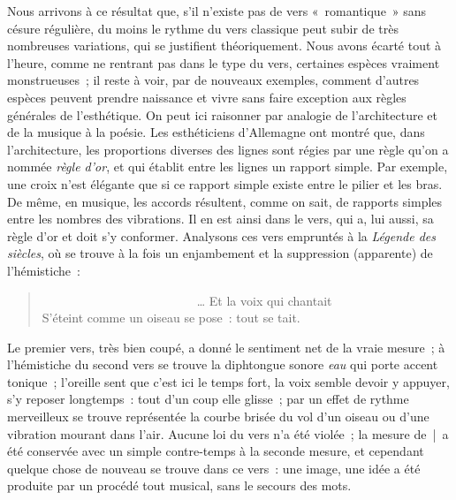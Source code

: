 \documentclass[french,twoside]{book} %
\begin{document}
Nous arrivons à ce résultat que, s’il n’existe pas de vers « romantique » sans césure régulière, du moins le rythme du vers classique peut subir de très nombreuses variations, qui se justifient théoriquement. Nous avons écarté tout à l’heure, comme ne rentrant pas dans le type du vers, certaines espèces vraiment monstrueuses ; il reste à voir, par de nouveaux exemples, comment d’autres espèces peuvent prendre naissance et vivre sans faire exception aux règles générales de l’esthétique. On peut ici raisonner par analogie de l’architecture et de la musique à la poésie. Les esthéticiens d’Allemagne ont montré que, dans l’architecture, les proportions diverses des lignes sont régies par une règle qu’on a nommée \emph{règle d’or}, et qui établit entre les lignes un rapport simple. Par exemple, une croix n’est  élégante que si ce rapport simple existe entre le pilier et les bras. De même, en musique, les accords résultent, comme on sait, de rapports simples entre les nombres des vibrations. Il en est ainsi dans le vers, qui a, lui aussi, sa règle d’or et doit s’y conformer. Analysons ces vers empruntés à la \emph{Légende des siècles}, où se trouve à la fois un enjambement et la suppression (apparente) de l’hémistiche :\par


\begin{verse}
                         … Et la voix qui chantait\\
S’éteint comme un oiseau se pose : tout se tait.\\
\end{verse}

\noindent Le premier vers, très bien coupé, a donné le sentiment net de la vraie mesure ; à l’hémistiche du second vers se trouve la diphtongue sonore \emph{eau} qui porte accent tonique ; l’oreille sent que c’est ici le temps fort, la voix semble devoir y appuyer, s’y reposer longtemps : tout d’un coup elle glisse ; par un effet de rythme merveilleux se trouve représentée la courbe brisée du vol d’un oiseau ou d’une vibration mourant dans l’air. Aucune loi du vers n’a été violée ; la mesure de | a été conservée avec un simple contre-temps à la seconde mesure, et cependant quelque chose de nouveau se trouve dans ce vers : une image, une idée a été produite par un procédé tout musical, sans le secours des mots.\par
\end{document}
